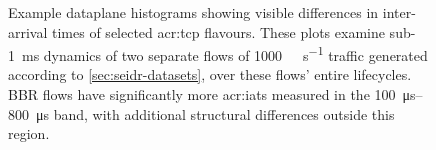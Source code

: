 \begin{figure}[]
    \centering
    \begin{subfigure}[t]{\linewidth}
        \centering
        \label{fig:cubic-hist-app}
    \end{subfigure}

    \begin{subfigure}[t]{\linewidth}
        \centering
        \label{fig:bbr-hist-app}
    \end{subfigure}

    \caption[Example dataplane histograms showing visible differences in inter-arrival times of selected TCP flavours.]{Example dataplane histograms showing visible differences in inter-arrival times of selected \gls{acr:tcp} flavours. These plots examine sub-\qty{1}{\milli\second} dynamics of two separate flows of \qty{1000}{\mega\bit\per\second} traffic generated according to \cref{sec:seidr-datasets}, over these flows' entire lifecycles. BBR flows have significantly more \glspl{acr:iat} measured in the \qtyrange{100}{800}{\micro\second} band, with additional structural differences outside this region.}
    \label{fig:tcp-hist-app}
\end{figure}

